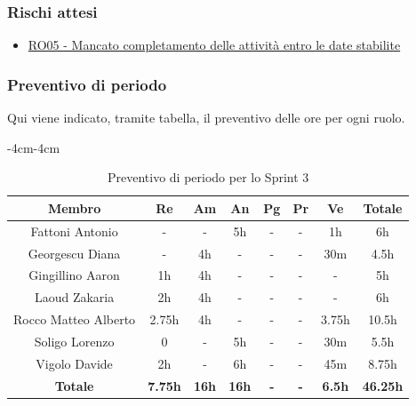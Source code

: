 \documentclass[a4paper,12pt]{article}
\begin{document}
\subsubsection{Rischi attesi}
\begin{itemize}
    \item \hyperref[RO05]{RO05 - Mancato completamento delle attività entro le date stabilite}
\end{itemize}


\subsubsection{Preventivo di periodo}
Qui viene indicato, tramite tabella, il preventivo delle ore per ogni ruolo.
\begin{table}[H]
    \begin{adjustwidth}{-4cm}{-4cm}
    \centering
    \begin{tabular}{|c|c|c|c|c|c|c|c|}
        \hline
        \textbf{Membro}         & \textbf{Re}   & \textbf{Am}   & \textbf{An}   & \textbf{Pg}   & \textbf{Pr}   & \textbf{Ve}   & \textbf{Totale} \\
        \hline
        Fattoni Antonio         & -             & -             & 5h             & -             & -             & 1h             & 6h \\
        \hline
        Georgescu Diana         & -             & 4h             & -             & -             & -             & 30m           & 4.5h \\
        \hline
        Gingillino Aaron        & 1h           & 4h             & -             & -             & -             & -             & 5h \\
        \hline
        Laoud Zakaria           & 2h             & 4h             & -             & -             & -             & -             & 6h \\
        \hline
        Rocco Matteo Alberto    & 2.75h         & 4h             & -             & -             & -             & 3.75h          & 10.5h\\
        \hline
        Soligo Lorenzo          & 0             & -             & 5h             & -             & -             & 30m             & 5.5h\\
        \hline
        Vigolo Davide           & 2h             & -             & 6h             & -             & -             & 45m           & 8.75h \\
        \hline
        \textbf{Totale}  &\textbf{7.75h} &\textbf{16h}  &\textbf{16h}    &\textbf{-}   &\textbf{-}  &\textbf{6.5h}  &\textbf{46.25h}\\
        \hline
    \end{tabular}
    \caption{Preventivo di periodo per lo Sprint 3}
    \end{adjustwidth}
\end{table}
\end{document}
